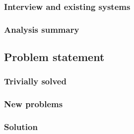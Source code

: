 \begin{frame}
\frametitle{Interview and existing systems}

\end{frame}

\begin{frame}
\frametitle{Analysis summary}

\end{frame}

\subsection{Problem statement}

\begin{frame}
\frametitle{Trivially solved}

\end{frame}

\begin{frame}
\frametitle{New problems}

\end{frame}

\begin{frame}
\frametitle{Solution}

\end{frame}